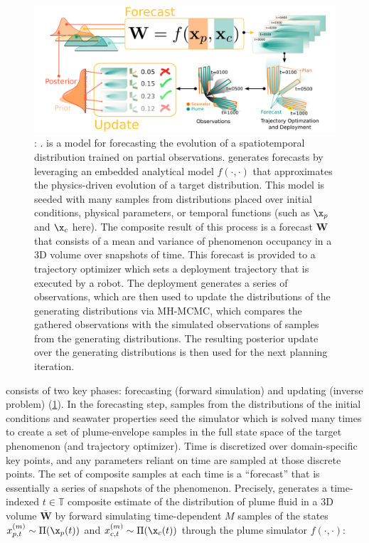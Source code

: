 \begin{figure}[h!]
    \centering
    \includegraphics[width=1\columnwidth]{figures/phumes_diagram.png}
    \caption{\textbf{\PHUMES}: \phumes. \PHUMES is a model for forecasting the evolution of a spatiotemporal distribution trained on partial observations. \PHUMES generates forecasts by leveraging an embedded analytical model $f(\cdot, \cdot)$ that approximates the physics-driven evolution of a target distribution. This model is seeded with many samples from distributions placed over initial conditions, physical parameters, or temporal functions (such as $\x_p$ and $\x_c$ here). The composite result of this process is a forecast $\mathbf{W}$ that consists of a mean and variance of phenomenon occupancy in a 3D volume over snapshots of time. This forecast is provided to a trajectory optimizer which sets a deployment trajectory that is executed by a robot. The deployment generates a series of observations, which are then used to update the distributions of the generating distributions via MH-MCMC, which compares the gathered observations with the simulated observations of samples from the generating distributions. The resulting posterior update over the generating distributions is then used for the next planning iteration.}
    \label{fig:phumes}
\end{figure}

\PHUMES consists of two key phases: forecasting (forward simulation) and updating (inverse problem) (\cref{fig:phumes}). In the forecasting step, samples from the distributions of the initial conditions and seawater properties seed the simulator which is solved many times to create a set of plume-envelope samples in the full state space of the target phenomenon (and trajectory optimizer). Time is discretized over domain-specific key points, and any parameters reliant on time are sampled at those discrete points. The set of composite samples at each time is a ``forecast'' that is essentially a series of snapshots of the phenomenon. Precisely, \PHUMES generates a time-indexed $t \in \mathbb{T}$ composite estimate of the distribution of plume fluid in a 3D volume $\overbar{\mathbf{W}}$ by forward simulating time-dependent $M$ samples of the states $x_{p,t}^{(m)} \sim \Pi(\x_p(t))$ and $x_{c,t}^{(m)} \sim \Pi(\x_c(t))$ through the plume simulator $f(\cdot, \cdot)$:

